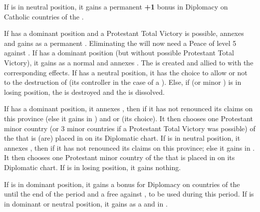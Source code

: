 \begin{digressions}
  \aparag[Austria] If \AUS is in neutral position, it gains a permanent {\bf
    +1} bonus in Diplomacy on Catholic countries of the \HRE.

  \bparag If \HOLhol has a dominant position and a Protestant Total Victory is
  possible, \paysHanse annexes \provinceOldenburg and \HOL gains \paysHanse as
  a permanent \VASSAL.  Eliminating the  will now need a Peace of level 5 against \HOL.
  \bparag If \HOLhol has a dominant position (but without possible Protestant
  Total Victory), it gains \paysHanse as a normal \VASSAL and \paysHanse
  annexes \provinceOldenburg. The  is
  created and allied to \HOLhol with the corresponding effects.
  \bparag If \HOL has a neutral position, it has the choice to allow or not to
  the destruction of \paysHanse (its controller in the case of a \HOLmin).
  \bparag Else, if \HOL (or minor \payshollande) is in losing position, the
  \paysHanse is destroyed and the  is
  dissolved.

  \aparag[Sweden]
  \bparag If \SUE has a dominant position, it annexes \provinceMecklenburg,
  then  if it has not renounced its claims on this
  province (else it gains \paysBrandebourg in \EG) and \provinceBremen or
  \provinceLubeck (its choice). It then chooses one Protestant minor country
  (or 3 minor countries if a Protestant Total Victory was possible) of the
  \HRE that is (are) placed in \EG on its Diplomatic chart.
  \bparag If \SUE is in neutral position, it annexes \provinceMecklenburg,
  then  if it has not renounced its claims on this
  province; else it gains \paysBrandebourg in \EG. It then chooses one
  Protestant minor country of the \HRE that is placed in \EG on its Diplomatic
  chart.
  \bparag If \SUE is in losing position, it gains nothing.

  \aparag[France]
  \bparag If \FRA is in dominant position, it gains a  bonus for
  Diplomacy on countries of the \HRE until the end of the period and a free
  \CB against \HIS, to be used during this period.
  \bparag If \FRA is in dominant or neutral position, it gains \paysAlsace as
  a \VASSAL and \paysCologne in \EC.


\end{digressions}
